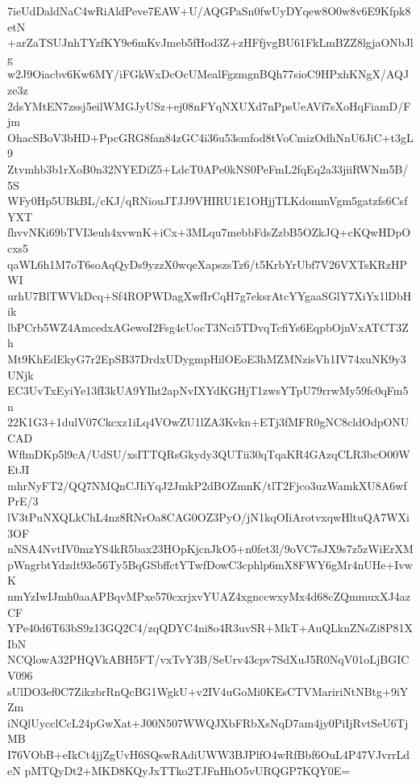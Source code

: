 7ieUdDaldNaC4wRiAldPeve7EAW+U/AQGPaSn0fwUyDYqew8O0w8v6E9Kfpk8etN
+arZaTSUJnhTYzfKY9e6mKvJmeb5fHod3Z+zHFfjvgBU61FkLmBZZ8lgjaONbJlg
w2J9Oiacbv6Kw6MY/iFGkWxDcOcUMealFgzmgnBQh77sioC9HPxhKNgX/AQJze3z
2dsYMtEN7zssj5eilWMGJyUSz+ej08nFYqNXUXd7nPpsUeAVf7sXoHqFiamD/Fjm
OhacSBoV3bHD+PpcGRG8fan84zGC4i36u53smfod8tVoCmizOdhNnU6JiC+t3gL9
Ztvmhb3b1rXoB0n32NYEDiZ5+LdcT0APe0kNS0PeFmL2fqEq2a33jiiRWNm5B/5S
WFy0Hp5UBkBL/cKJ/qRNiouJTJJ9VHIRU1E1OHjjTLKdommVgm5gatzfs6CsfYXT
fhvvNKi69bTVI3euh4xvwnK+iCx+3MLqu7mebbFdsZzbB5OZkJQ+cKQwHDpOcxs5
qaWL6h1M7oT6soAqQyDs9yzzX0wqeXapszsTz6/t5KrbYrUbf7V26VXTsKRzHPWI
urhU7BlTWVkDcq+Sf4ROPWDagXwfIrCqH7g7eksrAtcYYgaaSGlY7XiYx1lDbHik
lbPCrb5WZ4AmcedxAGewoI2Fsg4cUocT3Nci5TDvqTcfiYs6EqpbOjnVxATCT3Zh
Mt9KhEdEkyG7r2EpSB37DrdxUDygmpHilOEoE3hMZMNzisVh1IV74xuNK9y3UNjk
EC3UvTxEyiYe13fI3kUA9YIht2apNvIXYdKGHjT1zwsYTpU79rrwMy59fc0qFm5n
22K1G3+1dulV07Ckcxz1iLq4VOwZU1lZA3Kvkn+ETj3fMFR0gNC8cldOdpONUCAD
WflmDKp5l9cA/UdSU/xsITTQRsGkydy3QUTii30qTqaKR4GAzqCLR3bcO00WEtJI
mhrNyFT2/QQ7NMQnCJIiYqJ2JmkP2dBOZmnK/tlT2Fjco3uzWamkXU8A6wfPrE/3
lV3tPuNXQLkChL4nz8RNrOa8CAG0OZ3PyO/jN1kqOIiArotvxqwHltuQA7WXi3OF
nNSA4NvtIV0mzYS4kR5bax23HOpKjcnJkO5+n0fet3l/9oVC7sJX9s7z5zWiErXM
pWngrbtYdzdt93e56Ty5BqGSbffctYTwfDowC3cphlp6mX8FWY6gMr4nUHe+IvwK
nmYzIwIJmh0aaAPBqvMPxe570cxrjxvYUAZ4xgnccwxyMx4d68cZQmmuxXJ4azCF
YPe40d6T63bS9z13GQ2C4/zqQDYC4ni8o4R3uvSR+MkT+AuQLknZNsZi8P81XIbN
NCQlowA32PHQVkABH5FT/vxTvY3B/SeUrv43cpv7SdXuJ5R0NqV01oLjBGICV096
sUlDO3ef0C7ZikzbrRnQcBG1WgkU+v2IV4uGoMi0KEsCTVMaririNtNBtg+9iYZm
iNQlUycclCcL24pGwXat+J00N507WWQJXbFRbXsNqD7am4jy0PiIjRvtSeU6TjMB
I76VObB+eIkCt4jjZgUvH6SQswRAdiUWW3BJPlfO4wRfBbf6OuL4P47VJvrrLdeN
pMTQyDt2+MKD8KQyJxTTko2TJFnHhO5vURQGP7KQY0E=
